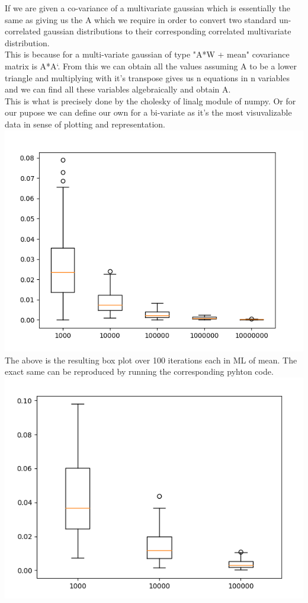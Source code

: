 \documentclass{article}
\begin{document}
        If we are given a co-variance of a multivariate gaussian which is essentially the same as giving
    us the A which we require in order to convert two standard un-correlated gaussian distributions to their
    corresponding correlated multivariate distribution.\\

        This is because for a multi-variate gaussian of type "A*W + mean" covariance matrix is A*A`. From this
    we can obtain all the values assuming A to be a lower triangle and multiplying with it's transpose gives
    us n equations in n variables and we can find all these variables algebraically and obtain A.\\

        This is what is precisely done by the cholesky of linalg module of numpy. Or for our pupose we can define
    our own for a bi-variate as it's the most visuvalizable data in sense of plotting and representation.\\
    \includegraphics[scale=.6]{../results/q2/q2partB.png}\\
    The above is the resulting box plot over 100 iterations each in ML of mean. The exact same can be reproduced by running the
    corresponding pyhton code.\\
    \includegraphics[scale=.6]{../results/q2/q2partC.png}\\
\end{document}
